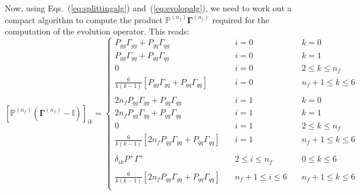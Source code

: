 \documentclass[10pt,a4paper]{article}
\begin{document}
Now, using Eqs.~(\ref{eq:splittingalg}) and~(\ref{eq:evolopalg}), we
need to work out a compact algorithm to compute the product
$\mathbb{P}^{(n_f)} {\bm\Gamma}^{(n_f)}$ required for the computation
of the evolution operator. This reads:
\begin{equation}\label{eq:PGamma}
\left[\mathbb{P}^{(n_f)}\left({\bm\Gamma}^{(n_f)}-\mathbb{I}\right)\right]_{ik}=
\left\{
\begin{array}{lll}
P_{gg}\Gamma_{gg}+P_{gq}\Gamma_{qg} & \quad i = 0 &\quad k = 0\\
P_{gg}\Gamma_{gq}+P_{gq}\Gamma_{qq} & \quad i = 0 & \quad k=1\\
0 &\quad i = 0 & \quad 2 \leq k \leq n_f\\
\frac{6}{k(k-1)}\left[ P_{gg}\Gamma_{gq}+P_{gq}\Gamma_{qq}\right]&\quad i = 0 & \quad n_f+1 \leq k \leq 6\\
\\
2n_fP_{qg}\Gamma_{gg}+P_{qq}\Gamma_{qg} & \quad i = 1 &\quad k = 0\\
2n_fP_{qg}\Gamma_{gq}+P_{qq}\Gamma_{qq} & \quad i = 1 & \quad k=1\\
0 &\quad i = 1 & \quad 2 \leq k \leq n_f\\
\frac{6}{k(k-1)} \left[2n_fP_{qg}\Gamma_{gq}+P_{qq}\Gamma_{qq}\right]&\quad i = 1 & \quad n_f+1 \leq k \leq 6\\
\\
\delta_{ik}P^+\Gamma^+ & \quad 2 \leq i \leq n_f & \quad 0 \leq k \leq 6\\
\\
\frac{6}{k(k-1)}\left[2n_fP_{qg}\Gamma_{gq}+P_{qq}\Gamma_{qq} \right]&\quad n_f+1 \leq i \leq 6 & \quad n_f+1 \leq k \leq 6\\
\end{array}
\right.
\end{equation}
\end{document}
